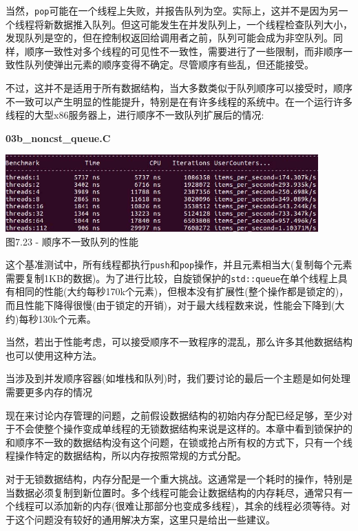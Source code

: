 当然，\texttt{pop}可能在一个线程上失败，并报告队列为空。实际上，这并不是因为另一个线程将新数据推入队列。但这可能发生在并发队列上，一个线程检查队列大小，发现队列是空的，但在控制权返回给调用者之前，队列可能会成为非空队列。同样，顺序一致性对多个线程的可见性不一致性，需要进行了一些限制，而非顺序一致性队列使弹出元素的顺序变得不确定。尽管顺序有些乱，但还能接受。

不过，这并不是适用于所有数据结构，当大多数类似于队列顺序可以接受时，顺序不一致可以产生明显的性能提升，特别是在有许多线程的系统中。在一个运行许多线程的大型x86服务器上，进行顺序不一致队列扩展后的情况:

\noindent
\textbf{03b\_noncst\_queue.C}
\begin{center}
\includegraphics[width=0.9\textwidth]{content/2/chapter7/images/23.jpg}\\
图7.23 - 顺序不一致队列的性能
\end{center}

这个基准测试中，所有线程都执行\texttt{push}和\texttt{pop}操作，并且元素相当大(复制每个元素需要复制1KB的数据)。为了进行比较，自旋锁保护的\texttt{std::queue}在单个线程上具有相同的性能(大约每秒170k个元素)，但根本没有扩展性(整个操作都是锁定的)，而且性能下降得很慢(由于锁定的开销)，对于最大线程数来说，性能会下降到(大约)每秒130k个元素。

当然，若出于性能考虑，可以接受顺序不一致程序的混乱，那么许多其他数据结构也可以使用这种方法。

当涉及到并发顺序容器(如堆栈和队列)时，我们要讨论的最后一个主题是如何处理需要更多内存的情况


现在来讨论内存管理的问题，之前假设数据结构的初始内存分配已经足够，至少对于不会使整个操作变成单线程的无锁数据结构来说是这样的。本章中看到锁保护的和顺序不一致的数据结构没有这个问题，在锁或抢占所有权的方式下，只有一个线程操作特定的数据结构，所以内存按照常规的方式分配。

对于无锁数据结构，内存分配是一个重大挑战。这通常是一个耗时的操作，特别是当数据必须复制到新位置时。多个线程可能会让数据结构的内存耗尽，通常只有一个线程可以添加新的内存(很难让那部分也变成多线程)，其余的线程必须等待。对于这个问题没有较好的通用解决方案，这里只是给出一些建议。

